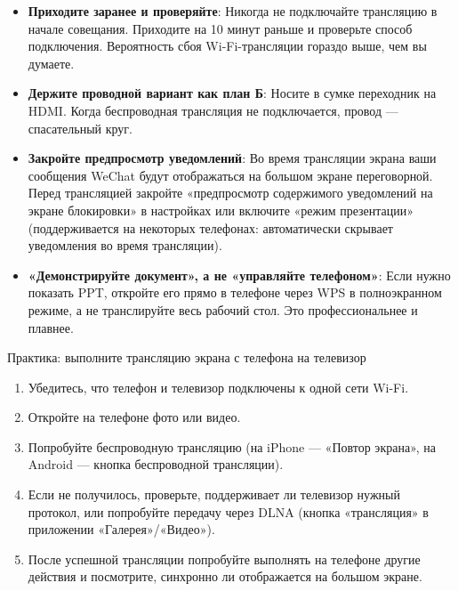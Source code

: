 \begin{itemize}
  \item \textbf{Приходите заранее и проверяйте}: Никогда не подключайте трансляцию в начале совещания. Приходите на 10 минут раньше и проверьте способ подключения. Вероятность сбоя Wi-Fi-трансляции гораздо выше, чем вы думаете.
  \item \textbf{Держите проводной вариант как план Б}: Носите в сумке переходник на HDMI. Когда беспроводная трансляция не подключается, провод — спасательный круг.
  \item \textbf{Закройте предпросмотр уведомлений}: Во время трансляции экрана ваши сообщения WeChat будут отображаться на большом экране переговорной. Перед трансляцией закройте «предпросмотр содержимого уведомлений на экране блокировки» в настройках или включите «режим презентации» (поддерживается на некоторых телефонах: автоматически скрывает уведомления во время трансляции).
  \item \textbf{«Демонстрируйте документ», а не «управляйте телефоном»}: Если нужно показать PPT, откройте его прямо в телефоне через WPS в полноэкранном режиме, а не транслируйте весь рабочий стол. Это профессиональнее и плавнее.
\end{itemize}

\begin{tcbpractice}{Практика: выполните трансляцию экрана с телефона на телевизор}
\begin{enumerate}
  \item Убедитесь, что телефон и телевизор подключены к одной сети Wi-Fi.
  \item Откройте на телефоне фото или видео.
  \item Попробуйте беспроводную трансляцию (на iPhone — «Повтор экрана», на Android — кнопка беспроводной трансляции).
  \item Если не получилось, проверьте, поддерживает ли телевизор нужный протокол, или попробуйте передачу через DLNA (кнопка «трансляция» в приложении «Галерея»/«Видео»).
  \item После успешной трансляции попробуйте выполнять на телефоне другие действия и посмотрите, синхронно ли отображается на большом экране.
\end{enumerate}

\end{tcbpractice}

